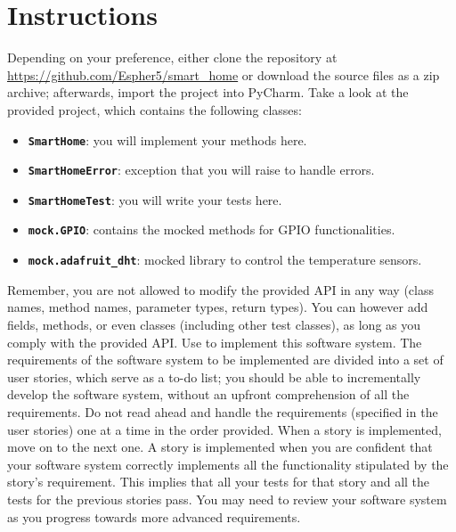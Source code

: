 \section{Instructions}
Depending on your preference, either clone the repository at \url{https://github.com/Espher5/smart_home} or download the source files as a zip archive; afterwards, import the project into PyCharm. 
Take a look at the provided project, which contains the following classes: 
\begin{itemize}
    \item \textbf{\texttt{SmartHome}}: you will implement your methods here.
    \item \textbf{\texttt{SmartHomeError}}: exception that you will raise to handle errors.
    \item \textbf{\texttt{SmartHomeTest}}: you will write your tests here.
    \item \textbf{\texttt{mock.GPIO}}: contains the mocked methods for GPIO functionalities.
    \item \textbf{\texttt{mock.adafruit\_dht}}: mocked library to control the temperature sensors.
\end{itemize}

Remember, you are not allowed to modify the provided API in any way (\ie class names, method names, parameter types, return types). You can however add fields, methods, or even classes (including other test classes), as long as you comply with the provided API.
Use \tdd to implement this software system.
The requirements of the software system to be implemented are divided into a set of user stories, which serve as a to-do list; you should be able to incrementally develop the software system, without an upfront comprehension of all the requirements. Do not read ahead and handle the requirements (\ie specified in the user stories) one at a time in the order provided.
When a story is implemented, move on to the next one. A story is
implemented when you are confident that your software system correctly implements all the functionality stipulated by the story's requirement. This implies that all your tests for that story and all the tests for the previous stories pass. You may need to review your software system as you progress towards more advanced requirements.


